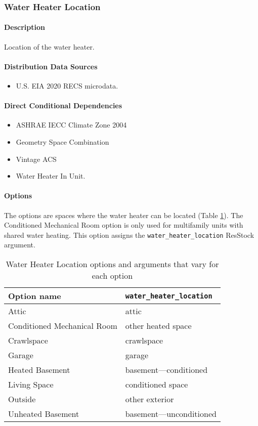 \subsubsection{Water Heater Location}\label{water_heater_location}
\paragraph{Description}
Location of the water heater.

\paragraph{Distribution Data Sources}
\begin{itemize}
\item
  U.S. EIA 2020 RECS microdata.
\end{itemize}

\paragraph{Direct Conditional Dependencies}
\begin{itemize}
    \item ASHRAE IECC Climate Zone 2004
    \item Geometry Space Combination
    \item Vintage ACS
    \item Water Heater In Unit.
\end{itemize}

\paragraph{Options}
The options are spaces where the water heater can be located (Table \ref{table:hc_opt_water_heater_loc}). The Conditioned Mechanical Room option is only used for multifamily units with shared water heating. This option assigns the \texttt{water\_heater\_location} ResStock argument.

\begin{longtable}[]{ |p{}|p{6cm}| }
\caption{Water Heater Location options and arguments that vary for each option} \label{table:hc_opt_water_heater_loc}  \\
\toprule\noalign{}
Option name & \texttt{water\_heater\_location} \\
\midrule\noalign{}
\endhead
\bottomrule\noalign{}
\endlastfoot
Attic & attic \\
Conditioned Mechanical Room & other heated space \\
Crawlspace & crawlspace \\
Garage & garage \\
Heated Basement & basement---conditioned \\
Living Space  & conditioned space \\
Outside & other exterior \\
Unheated Basement & basement---unconditioned \\
\end{longtable}

